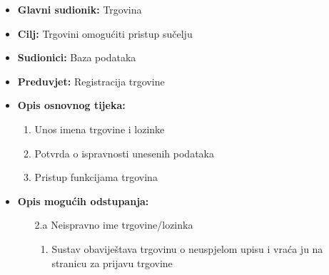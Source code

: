                         \noindent {}
					\begin{itemize}
	
						\item \textbf{Glavni sudionik: }Trgovina
						\item  \textbf{Cilj:}  Trgovini omogućiti pristup sučelju
						\item  \textbf{Sudionici:} Baza podataka
						\item  \textbf{Preduvjet:} Registracija trgovine
						\item  \textbf{Opis osnovnog tijeka:}
						
						\item[] \begin{enumerate}
							\item Unos imena trgovine i lozinke
                                \item Potvrda o ispravnosti unesenih podataka
                                \item Pristup funkcijama trgovina
						\end{enumerate}

                            \item  \textbf{Opis mogućih odstupanja:}
						
						\item[] \begin{enumerate}
	
							\item[2.a] Neispravno ime trgovine/lozinka
							\item[] \begin{enumerate}
								
								\item Sustav obaviještava trgovinu o neuspjelom upisu i vraća ju na stranicu za prijavu trgovine\\
								
							\end{enumerate}
			
							
						\end{enumerate}
						
					\end{itemize}

